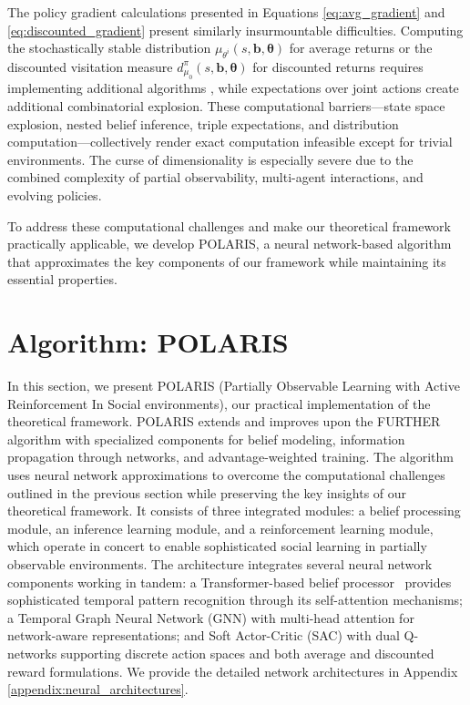 The policy gradient calculations presented in Equations \eqref{eq:avg_gradient} and \eqref{eq:discounted_gradient} present similarly insurmountable difficulties. Computing the stochastically stable distribution $\mu_{\theta^i}(s, \boldsymbol{b}, \boldsymbol{\theta})$ for average returns or the discounted visitation measure $d^{\pi}_{\mu_0}(s, \boldsymbol{b}, \boldsymbol{\theta})$ for discounted returns requires implementing additional algorithms \citep{wicks2012algorithmcomputingstochasticallystable}, while expectations over joint actions create additional combinatorial explosion. These computational barriers—state space explosion, nested belief inference, triple expectations, and distribution computation—collectively render exact computation infeasible except for trivial environments. The curse of dimensionality is especially severe due to the combined complexity of partial observability, multi-agent interactions, and evolving policies. 

To address these computational challenges and make our theoretical framework practically applicable, we develop POLARIS, a neural network-based algorithm that approximates the key components of our framework while maintaining its essential properties.

\section{Algorithm: POLARIS}

In this section, we present POLARIS (Partially Observable Learning with Active Reinforcement In Social environments), our practical implementation of the theoretical framework. POLARIS extends and improves upon the FURTHER algorithm \cite{kim2022influencing} with specialized components for belief modeling, information propagation through networks, and advantage-weighted training. The algorithm uses neural network approximations to overcome the computational challenges outlined in the previous section while preserving the key insights of our theoretical framework. It consists of three integrated modules: a belief processing module, an inference learning module, and a reinforcement learning module, which operate in concert to enable sophisticated social learning in partially observable environments. The architecture integrates several neural network components working in tandem: a Transformer-based belief processor~\cite{vaswani2017attention} provides sophisticated temporal pattern recognition through its self-attention mechanisms; a Temporal Graph Neural Network (GNN) with multi-head attention for network-aware representations; and Soft Actor-Critic (SAC) with dual Q-networks supporting discrete action spaces and both average and discounted reward formulations. We provide the detailed network architectures in Appendix \ref{appendix:neural_architectures}.


